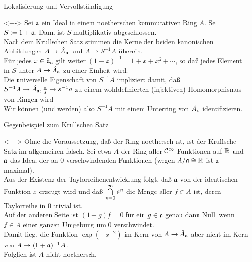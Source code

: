 \begin{frame}{Lokalisierung und Vervollständigung}
	\begin{remark}<+->
		Sei \(\mathfrak{a}\) ein Ideal in einem noetherschen kommutativen Ring \(A\). Sei \(S \coloneqq 1 + \mathfrak{a}\).
		Dann ist \(S\) multiplikativ abgeschlossen.
		\\
		Nach dem Krullschen Satz stimmen die Kerne der beiden kanonischen
		Abbildungen \(A \to \hat A_{\mathfrak{a}}\) und \(A \to S^{-1} A\) überein.
		\\
		Für jedes \(x \in \hat {\mathfrak{a}}_{\mathfrak{a}}\) gilt weiter \((1 - x)^{-1} = 1 + x + x^2 + \dotsb\), so daß
		jedes Element in \(S\) unter \(A \to \hat A_{\mathfrak{a}}\) zu einer Einheit wird.
		\\
		Die universelle Eigenschaft von \(S^{-1} A\) impliziert damit, daß \(S^{-1} A \to \hat A_{\mathfrak{a}},
		\frac a s \mapsto s^{-1} a\) zu einem wohldefinierten (injektiven) Homomorphismus von Ringen wird.
		\\
		Wir können (und werden) also \(S^{-1} A\) mit einem Unterring von \(\hat A_{\mathfrak{a}}\) identifizieren.
	\end{remark}
\end{frame}

\begin{frame}{Gegenbeispiel zum Krullschen Satz}
	\begin{example}<+->
		Ohne die Voraussetzung, daß der Ring noethersch ist, ist der Krullsche Satz im allgemeinen falsch.
		Sei etwa \(A\) der Ring aller \(\mathcal{C}^\infty\)-Funktionen auf \(\mathbb R\) und \(\mathfrak{a}\) das Ideal der
		an \(0\) verschwindenden Funktionen (wegen \(A/\mathfrak{a} \cong \mathbb R\) ist \(\mathfrak{a}\) maximal).
		\\
		Aus der Existenz der Taylorreihenentwicklung folgt, daß \(\mathfrak{a}\) von der identischen Funktion \(x\) erzeugt wird
		und daß \(\bigcap\limits_{n = 0}^\infty \mathfrak{a}^n\) die Menge aller \(f \in A\) ist, deren Taylorreihe in \(0\) trivial
		ist.
		\\
		Auf der anderen Seite ist \((1 + g) f = 0\) für ein \(g \in \mathfrak{a}\) genau dann Null, wenn \(f \in A\) einer ganzen
		Umgebung um \(0\) verschwindet.
		\\
		Damit liegt die Funktion \(\exp(-x^{-2})\) im Kern von \(A \to \hat A_{\mathfrak{a}}\) aber nicht im Kern von
		\(A \to (1 + \mathfrak{a})^{-1} A\).
		\\
		Folglich ist \(A\) nicht noethersch.
	\end{example}
\end{frame}


